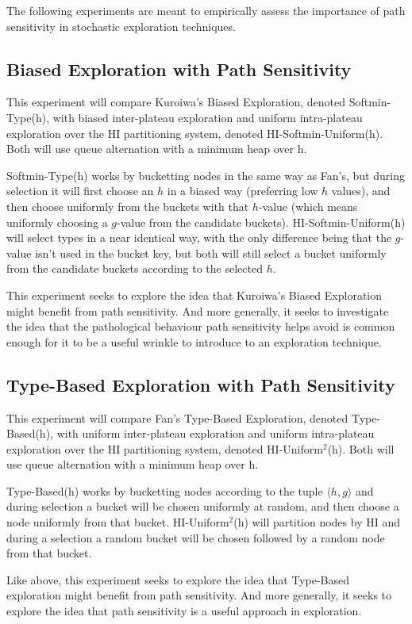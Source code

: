 \documentclass{article}
\theoremstyle{definition}
\begin{document}
The following experiments are meant to empirically assess the importance of path sensitivity in stochastic exploration techniques.

\subsection{Biased Exploration with Path Sensitivity}
This experiment will compare Kuroiwa's Biased Exploration, denoted Softmin-Type(h), with biased inter-plateau exploration and uniform intra-plateau exploration over the HI partitioning system, denoted HI-Softmin-Uniform(h). Both will use queue alternation with a minimum heap over h.  

Softmin-Type(h) works by bucketting nodes in the same way as Fan's, but during selection it will first choose an $h$ in a biased way (preferring low $h$ values), and then choose uniformly from the buckets with that $h$-value (which means uniformly choosing a $g$-value from the candidate buckets). HI-Softmin-Uniform(h) will select types in a near identical way, with the only difference being that the $g$-value isn't used in the bucket key, but both will still select a bucket uniformly from the candidate buckets according to the selected $h$.

This experiment seeks to explore the idea that Kuroiwa's Biased Exploration might benefit from path sensitivity. And more generally, it seeks to investigate the idea that the pathological behaviour path sensitivity helps avoid is common enough for it to be a useful wrinkle to introduce to an exploration technique.  

\subsection{Type-Based Exploration with Path Sensitivity}
This experiment will compare Fan's Type-Based Exploration, denoted Type-Based(h), with uniform inter-plateau exploration and uniform intra-plateau exploration over the HI partitioning system, denoted HI-Uniform$^2$(h). Both will use queue alternation with a minimum heap over h.  

Type-Based(h) works by bucketting nodes according to the tuple $\langle h, g \rangle$ and during selection a bucket will be chosen uniformly at random, and then choose a node uniformly from that bucket. HI-Uniform$^2$(h) will partition nodes by HI and during a selection a random bucket will be chosen followed by a random node from that bucket.

Like above, this experiment seeks to explore the idea that Type-Based exploration might benefit from path sensitivity. And more generally, it seeks to explore the idea that path sensitivity is a useful approach in exploration.
\end{document}
